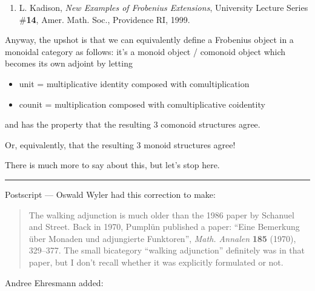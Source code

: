 \documentclass{article}
\def\tightlist{}
\begin{document}
\begin{enumerate}
\def\labelenumi{\arabic{enumi})}
\setcounter{enumi}{5}
\tightlist
\item
  L. Kadison, \emph{New Examples of Frobenius Extensions}, University
  Lecture Series \#\textbf{14}, Amer. Math. Soc., Providence RI, 1999.
\end{enumerate}

Anyway, the upshot is that we can equivalently define a Frobenius object
in a monoidal category as follows: it's a monoid object / comonoid
object which becomes its own adjoint by letting

\begin{itemize}
\tightlist
\item
  unit = multiplicative identity composed with comultiplication
\item
  counit = multiplication composed with comultiplicative coidentity
\end{itemize}

and has the property that the resulting 3 comonoid structures agree.

Or, equivalently, that the resulting 3 monoid structures agree!

There is much more to say about this, but let's stop here.

\begin{center}\rule{0.5\linewidth}{0.5pt}\end{center}

Postscript --- Oswald Wyler had this correction to make:

\begin{quote}
The walking adjunction is much older than the 1986 paper by Schanuel and
Street. Back in 1970, Pumplün published a paper: ``Eine Bemerkung über
Monaden und adjungierte Funktoren'', \emph{Math. Annalen} \textbf{185}
(1970), 329--377. The small bicategory ``walking adjunction'' definitely
was in that paper, but I don't recall whether it was explicitly
formulated or not.
\end{quote}

Andree Ehresmann added:
\end{document}
